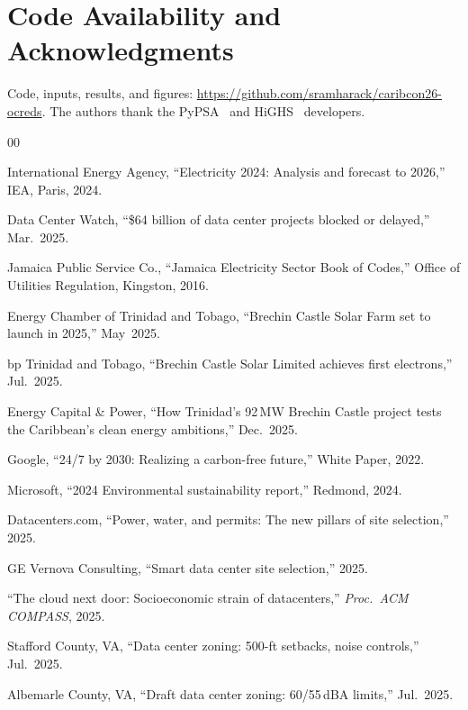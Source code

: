 \documentclass[conference,10pt]{IEEEtran}
\begin{document}
\section*{Code Availability and Acknowledgments}

Code, inputs, results, and figures: \url{https://github.com/sramharack/caribcon26-ocreds}. The authors thank the PyPSA~\cite{pypsa} and HiGHS~\cite{highs} developers.

\balance

\begin{thebibliography}{00}

 International Energy Agency, ``Electricity 2024: Analysis and forecast to 2026,'' IEA, Paris, 2024.

 Data Center Watch, ``\$64 billion of data center projects blocked or delayed,'' Mar.~2025.

 Jamaica Public Service Co., ``Jamaica Electricity Sector Book of Codes,'' Office of Utilities Regulation, Kingston, 2016.

 Energy Chamber of Trinidad and Tobago, ``Brechin Castle Solar Farm set to launch in 2025,'' May~2025.

 bp Trinidad and Tobago, ``Brechin Castle Solar Limited achieves first electrons,'' Jul.~2025.

 Energy Capital \& Power, ``How Trinidad's 92\,MW Brechin Castle project tests the Caribbean's clean energy ambitions,'' Dec.~2025.

 Google, ``24/7 by 2030: Realizing a carbon-free future,'' White Paper, 2022.

 Microsoft, ``2024 Environmental sustainability report,'' Redmond, 2024.

 Datacenters.com, ``Power, water, and permits: The new pillars of site selection,'' 2025.

 GE Vernova Consulting, ``Smart data center site selection,'' 2025.

 ``The cloud next door: Socioeconomic strain of datacenters,'' \textit{Proc.~ACM COMPASS}, 2025.

 Stafford County, VA, ``Data center zoning: 500-ft setbacks, noise controls,'' Jul.~2025.

 Albemarle County, VA, ``Draft data center zoning: 60/55\,dBA limits,'' Jul.~2025.


\end{thebibliography}
\end{document}
